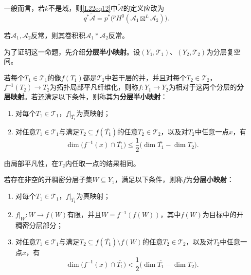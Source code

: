 \begin{note}[L22S1O2]
一般而言，若$k$不是域，则\eqref{L22eq12}中$\widetilde{\mathcal A}$的定义应改为
\[q^*\widetilde{\mathcal A}=p^*\bigl({}^pH^0(\mathcal A_1\boxtimes^L\mathcal A_2)\bigr).\]
\end{note}
\begin{proposition}\label{L22S1O3}若$\mathcal A_1,\mathcal A_2$反常，则其卷积积$\mathcal A_1*\mathcal A_2$反常。\end{proposition}
为了证明这一命题，先介绍\textbf{分层半小映射}。设$(Y_1,\mathcal T_1)$、$(Y_2,\mathcal T_2)$为分层复空间。
\begin{definition*}
若每个$T_1\in\mathcal T_1$的像$f(T_1)$都是$\mathcal T_2$中若干层的并，并且对每个$T_2\in\mathcal T_2$，$f^{-1}(T_2)\to T_2$为拓扑局部平凡纤维化，则称$f:Y_1\to Y_2$为相对于这两个分层的\textbf{分层映射}。若还满足以下条件，则称其为\textbf{分层半小映射}：
\begin{enumerate}[label=\arabic*.]
\item 对每个$T_1\in\mathcal T_1$，$f|_{\overline{T_1}}$为真映射；
\item 对任意$T_1\in\mathcal T_1$与满足$T_2\subseteq f(\overline{T_1})$的任意$T_2\in\mathcal T_2$，以及对$T_2$中任意一点$x$，有
\[\dim\bigl(f^{-1}(x)\cap\overline{T_1}\bigr)\le\frac12\bigl(\dim\overline{T_1}-\dim T_2\bigr).\]
\end{enumerate}
由局部平凡性，在$T_2$内任取一点的结果相同。
\end{definition*}
\begin{definition*}
若存在非空的开稠密分层子集$W\subseteq Y_1$，满足以下条件，则称$f$为\textbf{分层小映射}：
\begin{enumerate}[label=\arabic*.]
\item 对每个$T_1\in\mathcal T_1$，$f|_{\overline{T_1}}$为真映射；
\item $f|_W:W\to f(W)$有限，并且$W=f^{-1}(f(W))$，其中$f(W)$为目标中的开稠密分层部分；
\item 对任意$T_1\in\mathcal T_1$与满足$T_2\subseteq f(\overline{T_1})\setminus f(W)$的任意$T_2\in\mathcal T_2$，以及对$T_2$中任意一点$x$，有
\[\dim\bigl(f^{-1}(x)\cap\overline{T_1}\bigr)<\frac12\bigl(\dim\overline{T_1}-\dim T_2\bigr).\]
\end{enumerate}
\end{definition*}
